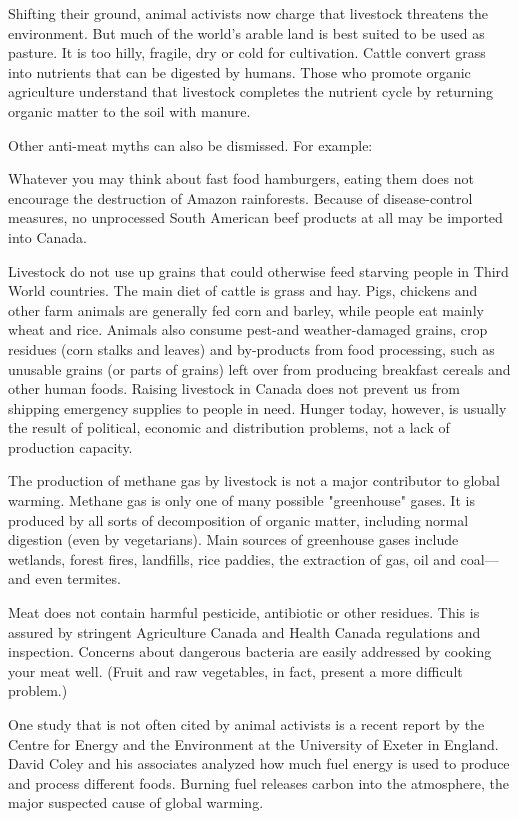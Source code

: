 \documentclass[a4paper]{article}
\begin{document}
Shifting their ground, animal activists now charge that livestock threatens the environment. But much of the world's arable land is best suited to be used as pasture. It is too hilly, fragile, dry or cold for cultivation. Cattle convert grass into nutrients that can be digested by humans. Those who promote organic agriculture understand that livestock completes the nutrient cycle by returning organic matter to the soil with manure.

 Other anti-meat myths can also be dismissed. For example: 

 Whatever you may think about fast food hamburgers, eating them does not encourage the destruction of Amazon rainforests. Because of disease-control measures, no unprocessed South American beef products at all may be imported into Canada.

 Livestock do not use up grains that could otherwise feed starving people in Third World countries. The main diet of cattle is grass and hay. Pigs, chickens and other farm animals are generally fed corn and barley, while people eat mainly wheat and rice. Animals also consume pest-and weather-damaged grains, crop residues (corn stalks and leaves) and by-products from food processing, such as unusable grains (or parts of grains) left over from producing breakfast cereals and other human foods. Raising livestock in Canada does not prevent us from shipping emergency supplies to people in need. Hunger today, however, is usually the result of political, economic and distribution problems, not a lack of production capacity. 

The production of methane gas by livestock is not a major contributor to global warming. Methane gas is only one of many possible "greenhouse" gases. It is produced by all sorts of decomposition of organic matter, including normal digestion (even by vegetarians). Main sources of greenhouse gases include wetlands, forest fires, landfills, rice paddies, the extraction of gas, oil and coal---and even termites. 

 Meat does not contain harmful pesticide, antibiotic or other residues. This is assured by stringent Agriculture Canada and Health Canada regulations and inspection. Concerns about dangerous bacteria are easily addressed by cooking your meat well. (Fruit and raw vegetables, in fact, present a more difficult problem.)

One study that is not often cited by animal activists is a recent report by the Centre for Energy and the Environment at the University of Exeter in England. David Coley and his associates analyzed how much fuel energy is used to produce and process different foods. Burning fuel releases carbon into the atmosphere, the major suspected cause of global warming.
\end{document}
